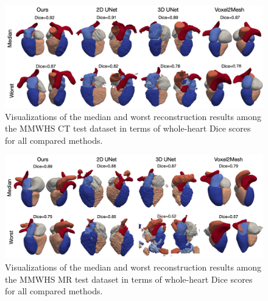 \documentclass[times,review,preprint,authoryear]{elsarticle}
\begin{document}
\begin{figure}[H]
\centering
\includegraphics[width=\textwidth]{ct_median_worst.png}
\caption{Visualizations of the median and worst reconstruction results among the MMWHS CT test dataset in terms of whole-heart Dice scores for all compared methods.} 
\label{figure:ct_median_worst}
\end{figure}

\begin{figure}[H]
\centering
\includegraphics[width=\textwidth]{mr_median_worst.png}
\caption{Visualizations of the median and worst reconstruction results among the MMWHS MR test dataset in terms of whole-heart Dice scores for all compared methods.} 
\label{figure:mr_median_worst}
\end{figure}
\end{document}
